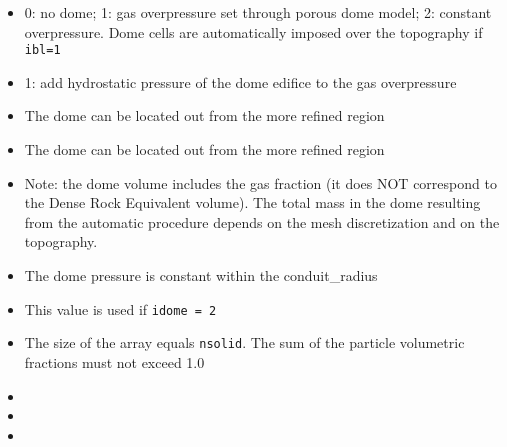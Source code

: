 \begin{itemize}
\item
{}
{0: no dome; 1: gas overpressure set through porous dome model; 2: constant overpressure.
Dome cells are automatically imposed over the topography if {\tt ibl=1}}

\item
{}
{1: add hydrostatic pressure of the dome edifice to the gas overpressure}

\item
{}
{The dome can be located out from the more refined region}

\item
{}
{The dome can be located out from the more refined region}

\item
{}
{Note: the dome volume includes the gas fraction (it does NOT correspond to the
Dense Rock Equivalent volume). The total mass in the dome resulting from the
automatic procedure depends on the mesh discretization and on the topography.}

\item
{}
{The dome pressure is constant within the conduit\_radius}

\item
{}
{This value is used if {\tt idome = 2}}

\item
{}
{The size of the array equals {\tt nsolid}. The sum of the particle volumetric fractions
must not exceed 1.0}

\item
{}
{}

\item
{}
{}

\item
{}


\end{itemize}
